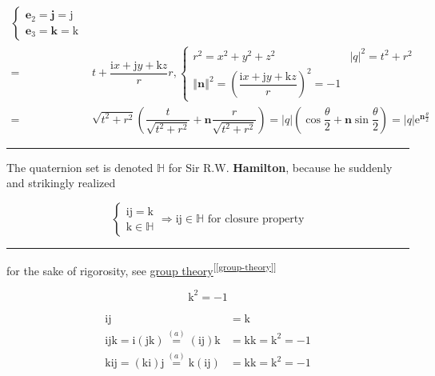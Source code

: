 \documentclass[
]{book}
\theoremstyle{definition}
\theoremstyle{definition}
\theoremstyle{definition}
\theoremstyle{definition}
\theoremstyle{remark}
\begin{document}
\[\begin{aligned}
\begin{cases}
\boldsymbol{e}_{{\scriptscriptstyle 2}}=\boldsymbol{j}=\mathrm{j}\\
\boldsymbol{e}_{{\scriptscriptstyle 3}}=\boldsymbol{k}=\mathrm{k}
\end{cases}\\
= & t+\dfrac{\mathrm{i}x+\mathrm{j}y+\mathrm{k}z}{r}r,\begin{cases}
r^{2}=x^{2}+y^{2}+z^{2} & \left|q\right|^{2}=t^{2}+r^{2}\\
\left\Vert \boldsymbol{n}\right\Vert ^{2}=\left(\dfrac{\mathrm{i}x+\mathrm{j}y+\mathrm{k}z}{r}\right)^{2}=-1
\end{cases}\\
= & \sqrt{t^{2}+r^{2}}\left(\dfrac{t}{\sqrt{t^{2}+r^{2}}}+\boldsymbol{n}\dfrac{r}{\sqrt{t^{2}+r^{2}}}\right)=\left|q\right|\left(\cos\dfrac{\theta}{2}+\boldsymbol{n}\sin\dfrac{\theta}{2}\right)=\left|q\right|\mathrm{e}^{\boldsymbol{n}\frac{\theta}{2}}
\end{aligned}
\]

\begin{center}\rule{0.5\linewidth}{0.5pt}\end{center}

The quaternion set is denoted \(\mathbb{H}\) for Sir R.W. \textbf{Hamilton}, because he suddenly and strikingly realized

\[
\begin{cases}
\mathrm{i}\mathrm{j}=\mathrm{k}\\
\mathrm{k}\in\mathbb{H}
\end{cases}\Rightarrow\mathrm{i}\mathrm{j}\in\mathbb{H}\text{ for closure property}
\]

\begin{center}\rule{0.5\linewidth}{0.5pt}\end{center}

for the sake of rigorosity, see \hyperref[group-theory]{group theory}\textsuperscript{{[}\ref{group-theory}{]}}

\[
\mathrm{k}^{2}=-1
\]

\[
\begin{aligned}
\mathrm{i}\mathrm{j} & =\mathrm{k}\\
\mathrm{i}\mathrm{j}\mathrm{k}=\mathrm{i}\left(\mathrm{j}\mathrm{k}\right)\overset{\left(a\right)}{=}\left(\mathrm{i}\mathrm{j}\right)\mathrm{k} & =\mathrm{k}\mathrm{k}=\mathrm{k}^{2}=-1\\
\mathrm{k}\mathrm{i}\mathrm{j}=\left(\mathrm{k}\mathrm{i}\right)\mathrm{j}\overset{\left(a\right)}{=}\mathrm{k}\left(\mathrm{i}\mathrm{j}\right) & =\mathrm{k}\mathrm{k}=\mathrm{k}^{2}=-1
\end{aligned}
\]
\end{document}

